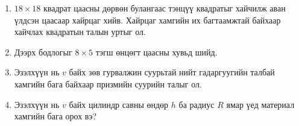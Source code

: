 \begin{enumerate}
\begin{enumerate}
\item $18\times 18$ квадрат цаасны дөрвөн булангаас тэнцүү квадратыг хайчилж аван үлдсэн цаасаар хайрцаг хийв. Хайрцаг хамгийн их багтаамжтай байхаар хайчлах квадратын талын уртыг ол.

\item Дээрх бодлогыг  $8\times 5$ тэгш өнцөгт цаасны хувьд шийд.

\item Эзэлхүүн нь $v$ байх зөв гурвалжин суурьтай  нийт гадаргуугийн талбай хамгийн бага байхаар призмийн суурийн талыг ол.

\item Эзэлхүүн нь $v$ байх цилиндр савны өндөр $h$ ба радиус $R$ ямар үед материал хамгийн бага орох вэ?
\end{enumerate}
\end{enumerate}
\newpage
